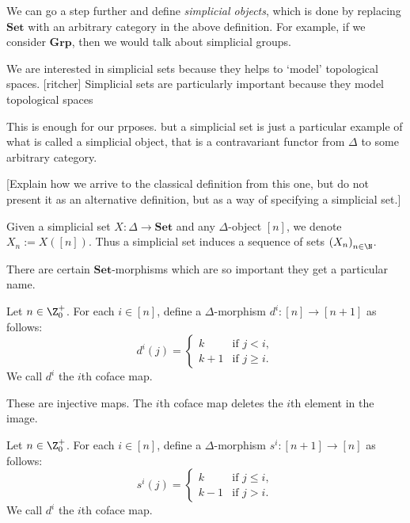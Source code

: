 
We can go a step further and define   \textit{simplicial objects}, which is done by replacing \(\mathbf{Set}\) with an arbitrary category in the above definition. 
For example, if we consider \(\mathbf{Grp}\), then we would talk about simplicial groups.

We are interested in simplicial sets because they helps to `model' topological spaces. 
[ritcher] Simplicial sets are particularly important because they model topological spaces

This is enough for our prposes.
but
a simplicial set is just a particular example of what is called a simplicial object, that is a contravariant functor from \(\Delta\) to some arbitrary category.

[Explain how we arrive to the classical definition from this one, but do not present it as an alternative definition, but as a way of specifying a simplicial set.]



\begin{remark}
    Given a simplicial set \(X\colon \Delta\to \mathbf{Set}\) and any \(\Delta\)-object \([n]\), 
    we denote \(X_n := X([n])\).
    Thus a simplicial set induces a sequence of sets \(\left( X_n \right)_{n\in\N}\).
\end{remark}

There are certain \(\mathbf{Set}\)-morphisms which are so important they get a particular name.

\begin{definition}
    Let \(n\in \Z^+_0\). 
    For each \(i\in [n]\), 
    define a \(\Delta\)-morphism \(d^i\colon [n] \to [n+1]\) as follows:
    \[d^i(j) = \begin{cases}
        k& \text{if } j < i,\\
        k+1 & \text{if } j\geq  i.
    \end{cases}\]
    We call \(d^i\) the \(i\)th coface map.
\end{definition}

These are injective maps.
The \(i\)th coface map deletes the \(i\)th element in the image.

\begin{definition}
    Let \(n\in \Z^+_0\). 
    For each \(i\in [n]\), 
    define a \(\Delta\)-morphism \(s^i\colon [n+1] \to [n]\) as follows:
    \[s^i(j) = \begin{cases}
        k& \text{if } j \leq i,\\
        k-1 & \text{if } j >  i.
    \end{cases}\]
    We call \(d^i\) the \(i\)th coface map.
\end{definition}

